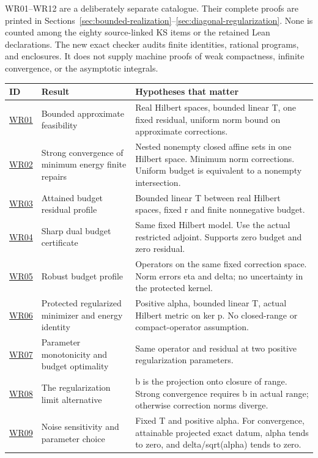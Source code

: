 \clearpage
{}\label{app:written}
WR01--WR12 are a deliberately separate catalogue. Their complete proofs are printed in Sections~\ref{sec:bounded-realization}--\ref{sec:diagonal-regularization}. None is counted among the eighty source-linked KS items or the retained Lean declarations. The new exact checker audits finite identities, rational programs, and enclosures. It does not supply machine proofs of weak compactness, infinite convergence, or the asymptotic integrals.
\begin{longtable}{@{}p{.10\linewidth}p{.38\linewidth}p{.43\linewidth}@{}}
\toprule ID & Result & Hypotheses that matter\\\midrule\endhead
\hyperref[WR01]{WR01} & Bounded approximate feasibility & Real Hilbert spaces, bounded linear T, one fixed residual, uniform norm bound on approximate corrections.\\[5pt]
\hyperref[WR02]{WR02} & Strong convergence of minimum energy finite repairs & Nested nonempty closed affine sets in one Hilbert space. Minimum norm corrections. Uniform budget is equivalent to a nonempty intersection.\\[5pt]
\hyperref[WR03]{WR03} & Attained budget residual profile & Bounded linear T between real Hilbert spaces, fixed r and finite nonnegative budget.\\[5pt]
\hyperref[WR04]{WR04} & Sharp dual budget certificate & Same fixed Hilbert model. Use the actual restricted adjoint. Supports zero budget and zero residual.\\[5pt]
\hyperref[WR05]{WR05} & Robust budget profile & Operators on the same fixed correction space. Norm errors eta and delta; no uncertainty in the protected kernel.\\[5pt]
\hyperref[WR06]{WR06} & Protected regularized minimizer and energy identity & Positive alpha, bounded linear T, actual Hilbert metric on ker p. No closed-range or compact-operator assumption.\\[5pt]
\hyperref[WR07]{WR07} & Parameter monotonicity and budget optimality & Same operator and residual at two positive regularization parameters.\\[5pt]
\hyperref[WR08]{WR08} & The regularization limit alternative & b is the projection onto closure of range. Strong convergence requires b in actual range; otherwise correction norms diverge.\\[5pt]
\hyperref[WR09]{WR09} & Noise sensitivity and parameter choice & Fixed T and positive alpha. For convergence, attainable projected exact datum, alpha tends to zero, and delta/sqrt(alpha) tends to zero.\\[5pt]

\end{longtable}
